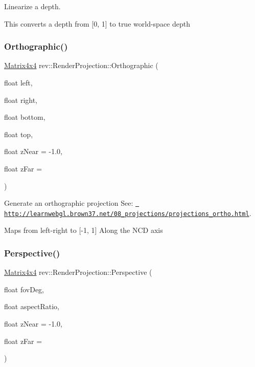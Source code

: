 Linearize a depth. 

This converts a depth from \mbox{[}0, 1\mbox{]} to true world-\/space depth \mbox{\label{classrev_1_1_render_projection_a5a56c0550c8869aa1688f6a49986d51e}} 
\subsubsection{\texorpdfstring{Orthographic()}{Orthographic()}}
{\footnotesize\ttfamily \mbox{\hyperlink{classrev_1_1_square_matrix}{Matrix4x4}} rev\+::\+Render\+Projection\+::\+Orthographic (\begin{DoxyParamCaption}\item[{float}]{left,  }\item[{float}]{right,  }\item[{float}]{bottom,  }\item[{float}]{top,  }\item[{float}]{z\+Near = {\ttfamily -\/1.0},  }\item[{float}]{z\+Far = {} }\end{DoxyParamCaption})\hspace{0.3cm}{\ttfamily [static]}}



Generate an orthographic projection See\+: \href{http://learnwebgl.brown37.net/08_projections/projections_ortho.html}{\texttt{ http\+://learnwebgl.\+brown37.\+net/08\+\_\+projections/projections\+\_\+ortho.\+html}}. 

Maps from left-\/right to \mbox{[}-\/1, 1\mbox{]} Along the N\+CD axis \mbox{\label{classrev_1_1_render_projection_af3d0f27f0b8e8eda47d04fee0174497c}} 
\subsubsection{\texorpdfstring{Perspective()}{Perspective()}}
{\footnotesize\ttfamily \mbox{\hyperlink{classrev_1_1_square_matrix}{Matrix4x4}} rev\+::\+Render\+Projection\+::\+Perspective (\begin{DoxyParamCaption}\item[{float}]{fov\+Deg,  }\item[{float}]{aspect\+Ratio,  }\item[{float}]{z\+Near = {\ttfamily -\/1.0},  }\item[{float}]{z\+Far = {} }\end{DoxyParamCaption})\hspace{0.3cm}{\ttfamily [static]}}



